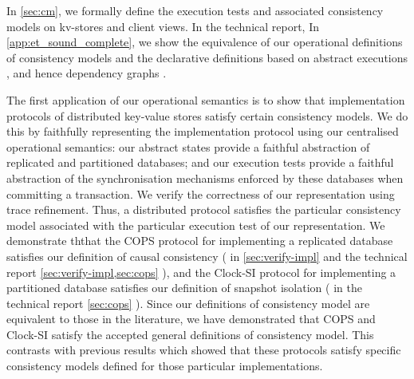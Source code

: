 In \cref{sec:cm}, we formally define the  execution tests and 
associated consistency models on kv-stores and client views. 
\ifTechRepEdits%
In the technical report,
\else%
In \cref{app:et_sound_complete},
\fi
we show the equivalence of our operational definitions of consistency
models and 
the declarative definitions  based on abstract executions \cite{framework-concur},
and hence dependency graphs \cite{adya}. 



The first application of our operational
semantics is to show that  implementation protocols  of distributed
key-value stores satisfy certain consistency models. We do this by
faithfully representing the implementation protocol using our centralised
operational semantics: our abstract states provide a faithful abstraction of replicated and partitioned
databases; and our execution tests provide a faithful abstraction of the synchronisation mechanisms 
enforced by these databases when committing a transaction. 
We  verify the correctness of our representation 
using trace refinement. Thus, a distributed protocol
satisfies  the particular consistency model associated with the
particular execution
test of our representation. 
We demonstrate ththat the COPS protocol \citep{cops} for implementing
a replicated database satisfies our definition of causal consistency (%
\ifTechRepEdits%
in \cref{sec:verify-impl} and the technical report%
\else%
\cref{sec:verify-impl,sec:cops}%
\fi%
), and the Clock-SI protocol \citep{clocksi} for implementing a
partitioned database satisfies our definition of snapshot isolation (%
\ifTechRepEdits%
in the technical report%
\else%
\cref{sec:cops}%
\fi%
).  Since our definitions of consistency model are equivalent to those
in the literature, we have demonstrated that COPS and Clock-SI satisfy
the accepted general definitions of consistency model. This contrasts
with 
previous results which showed that these protocols satisfy specific
consistency models  defined for those
particular implementations.


